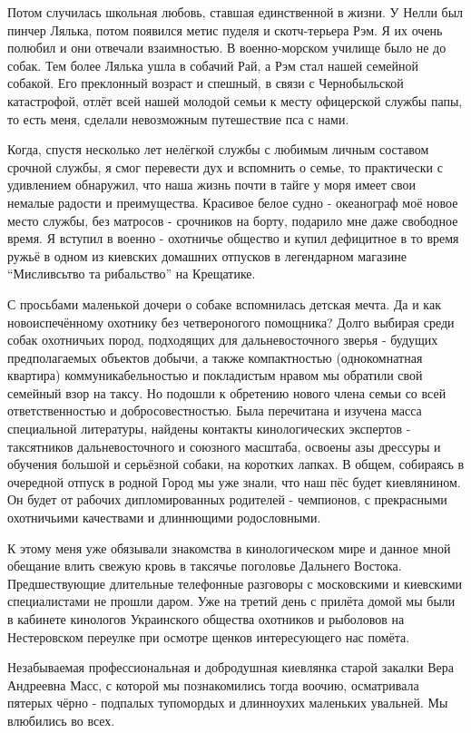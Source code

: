 Потом случилась школьная любовь, ставшая единственной в
жизни. У Нелли был пинчер Лялька, потом появился метис пуделя и скотч-терьера
Рэм. Я их очень полюбил и они отвечали взаимностью. В военно-морском училище
было не до собак. Тем более Лялька ушла в собачий Рай, а Рэм стал нашей
семейной собакой. Его преклонный возраст и спешный, в связи с Чернобыльской
катастрофой, отлёт всей нашей молодой семьи к месту офицерской службы папы, то
есть меня, сделали невозможным путешествие пса с нами. 

Когда, спустя несколько
лет нелёгкой службы с любимым личным составом срочной службы, я смог перевести
дух и вспомнить о семье, то практически с удивлением обнаружил, что наша жизнь
почти в тайге у моря имеет свои немалые радости и преимущества. Красивое белое
судно - океанограф моё новое место службы, без матросов - срочников на борту,
подарило мне даже свободное время. Я вступил в военно - охотничье общество и
купил дефицитное в то время ружьё в одном из киевских домашних отпусков в
легендарном магазине \enquote{Мисливсьтво та рибальство} на Крещатике. 

С просьбами маленькой дочери о собаке вспомнилась детская мечта. Да и как
новоиспечённому охотнику без четвероногого помощника? Долго выбирая среди собак
охотничьих пород, подходящих для дальневосточного зверья - будущих
предполагаемых объектов добычи, а также компактностью (однокомнатная квартира)
коммуникабельностью и покладистым нравом мы обратили свой семейный взор на
таксу. Но подошли к обретению нового члена семьи со всей ответственностью и
добросовестностью. Была перечитана и изучена масса специальной литературы,
найдены контакты кинологических экспертов - таксятников дальневосточного и
союзного масштаба, освоены азы дрессуры и обучения большой и серьёзной собаки,
на коротких лапках.  В общем, собираясь в очередной отпуск в родной Город мы
уже знали, что наш пёс будет киевлянином. Он будет от рабочих дипломированных
родителей - чемпионов, с прекрасными охотничьими качествами и длиннющими
родословными. 

К этому меня уже
обязывали знакомства в кинологическом мире и данное мной обещание влить свежую
кровь в таксячье поголовье Дальнего Востока. Предшествующие длительные
телефонные разговоры с московскими и киевскими специалистами не прошли даром.
Уже на третий день с прилёта домой мы были в кабинете кинологов Украинского
общества охотников и рыболовов на Нестеровском переулке при осмотре щенков
интересующего нас помёта. 

Незабываемая профессиональная и добродушная киевлянка старой закалки Вера
Андреевна Масс, с которой мы познакомились тогда воочию, осматривала пятерых
чёрно - подпалых тупомордых и длинноухих маленьких увальней. Мы влюбились во
всех. 

